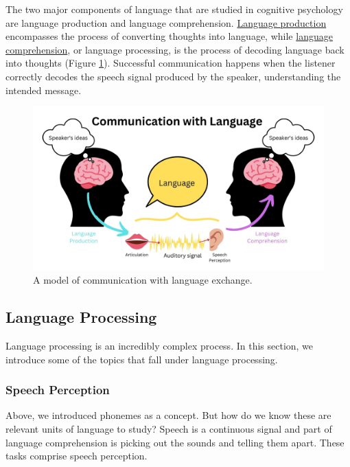 \documentclass[
]{krantz}
\begin{document}
The two major components of language that are studied in cognitive psychology are language production and language comprehension. \hyperref[langproddef]{Language production} encompasses the process of converting thoughts into language, while \hyperref[language-comprehension]{language comprehension}, or language processing, is the process of decoding language back into thoughts (Figure \ref{fig:model}). Successful communication happens when the listener correctly decodes the speech signal produced by the speaker, understanding the intended message.

\begin{figure}

{\centering \includegraphics[width=0.8\linewidth]{images/ch8/model_of_language_draft} 

}

\caption{A model of communication with language exchange.}\label{fig:model}
\end{figure}

\subsection*{Language Processing}\label{language-processing}


Language processing is an incredibly complex process. In this section, we introduce some of the topics that fall under language processing.

\subsubsection*{Speech Perception}\label{speech-perception}


Above, we introduced phonemes as a concept. But how do we know these are relevant units of language to study? Speech is a continuous signal and part of language comprehension is picking out the sounds and telling them apart. These tasks comprise speech perception.
\end{document}
